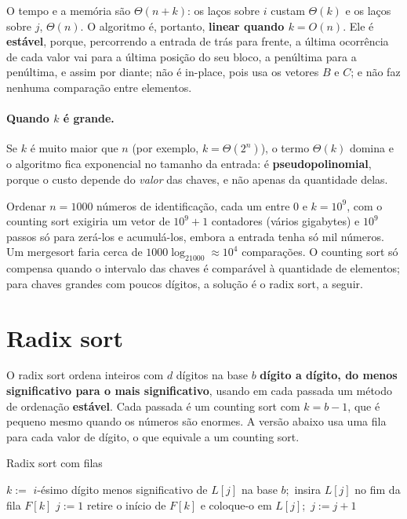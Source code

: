 O tempo e a memória são $\Theta(n+k)$: os laços sobre $i$ custam $\Theta(k)$ e os laços sobre $j$, $\Theta(n)$. O algoritmo é, portanto, \textbf{linear quando $k=O(n)$}. Ele é \textbf{estável}, porque, percorrendo a entrada de trás para frente, a última ocorrência de cada valor vai para a última posição do seu bloco, a penúltima para a penúltima, e assim por diante; não é in-place, pois usa os vetores $B$ e $C$; e não faz nenhuma comparação entre elementos.

\paragraph{Quando $k$ é grande.} Se $k$ é muito maior que $n$ (por exemplo, $k=\Theta(2^n)$), o termo $\Theta(k)$ domina e o algoritmo fica exponencial no tamanho da entrada: é \textbf{pseudopolinomial}, porque o custo depende do \emph{valor} das chaves, e não apenas da quantidade delas.

\begin{exemplo}
Ordenar $n=1000$ números de identificação, cada um entre 0 e $k=10^9$, com o counting sort exigiria um vetor de $10^9+1$ contadores (vários gigabytes) e $10^9$ passos só para zerá-los e acumulá-los, embora a entrada tenha só mil números. Um mergesort faria cerca de $1000\log_21000\approx10^4$ comparações. O counting sort só compensa quando o intervalo das chaves é comparável à quantidade de elementos; para chaves grandes com poucos dígitos, a solução é o radix sort, a seguir.
\end{exemplo}

\section{Radix sort}\label{sec:radix}
O radix sort ordena inteiros com $d$ dígitos na base $b$ \textbf{dígito a dígito, do menos significativo para o mais significativo}, usando em cada passada um método de ordenação \textbf{estável}. Cada passada é um counting sort com $k=b-1$, que é pequeno mesmo quando os números são enormes. A versão abaixo usa uma fila para cada valor de dígito, o que equivale a um counting sort.
\begin{pseudo}{Radix sort com filas}
\begin{algorithmic}
    \State $k:=$ $i$-ésimo dígito menos significativo de $L[j]$ na base $b$;\ insira $L[j]$ no fim da fila $F[k]$
  \EndFor
  \State $j:=1$
     \State retire o início de $F[k]$ e coloque-o em $L[j]$;\ $j:=j+1$ \EndWhile
  \EndFor
\EndFor
\end{algorithmic}
\end{pseudo}

